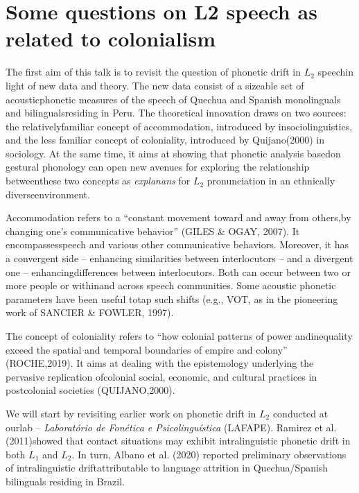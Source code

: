 \chapter{Some questions on L2 speech as related to colonialism}\label{ch:eleonora}
\begin{affils}
\end{affils}

\noindent
The first aim of this talk is to revisit the question of phonetic drift in $L_2$
speechin light of new data and theory. The new data consist of a sizeable set
of acousticphonetic measures of the speech of Quechua and Spanish monolinguals
and bilingualsresiding in Peru. The theoretical innovation draws on two
sources: the relativelyfamiliar concept of accommodation, introduced by \citeauthor{Giles1973}
insociolinguistics, and the less familiar concept of
coloniality, introduced by Quijano(2000) in sociology. At the same time, it
aims at showing that phonetic analysis basedon gestural phonology can open new
avenues for exploring the relationship betweenthese two concepts as \textit{explanans}
for $L_2$ pronunciation in an ethnically diverseenvironment.

Accommodation refers to a “constant movement toward and away from others,by
changing one’s communicative behavior” (GILES \& OGAY, 2007). It
encompassesspeech and various other communicative behaviors. Moreover, it has a
convergent side -- enhancing similarities between interlocutors -- and a divergent
one -- enhancingdifferences between interlocutors. Both can occur between two or
more people or withinand across speech communities. Some acoustic phonetic
parameters have been useful totap such shifts (e.g., VOT, as in the pioneering
work of SANCIER \& FOWLER, 1997).

The concept of coloniality refers to “how colonial patterns of power
andinequality exceed the spatial and temporal boundaries of empire and colony”
(ROCHE,2019). It aims at dealing with the epistemology underlying the pervasive
replication ofcolonial social, economic, and cultural practices in postcolonial
societies (QUIJANO,2000).
 
We will start by revisiting earlier work on phonetic drift in $L_2$ conducted at
ourlab -- \textit{Laboratório de Fonética e Psicolinguística} (LAFAPE). Ramirez
et al. (2011)showed that contact situations may exhibit intralinguistic
phonetic drift in both $L_1$ and $L_2$. In turn, Albano et al. (2020) reported
preliminary observations of intralinguistic driftattributable to language
attrition in Quechua/Spanish bilinguals residing in Brazil.


